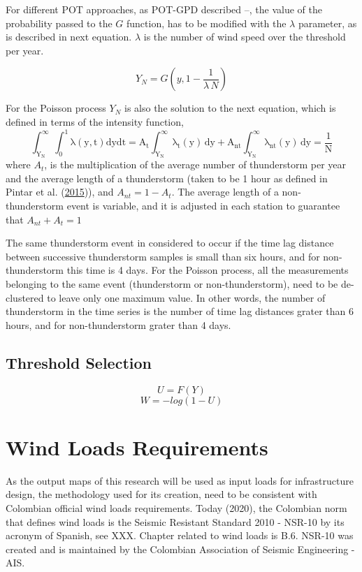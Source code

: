 \documentclass[12pt,oneside]{reedthesis}
\begin{document}
For different POT approaches, as POT-GPD described --, the value of the probability passed to the \(G\) function, has to be modified with the \(\lambda\) parameter, as is described in next equation. \(\lambda\) is the number of wind speed over the threshold per year.

\[
Y_N =G\left(y, 1-\frac{1}{\lambda\,N}\right)
\]

For the Poisson process \(Y_N\) is also the solution to the next equation, which is defined in terms of the intensity function,
\begin{equation}
  \mathrm{
          \int_{Y_N}^{\infty}\int_0^1\lambda\left( y,t\right)dydt = A_t\int_{Y_N}^{\infty}\lambda_t\left( y\right)\,dy + A_{nt}\int_{Y_N}^{\infty}\lambda_{nt}\left( y\right)\,dy = \frac{1}{N}
         }
  \label{eq:ppmri}
\end{equation}
where \(A_t\), is the multiplication of the average number of thunderstorm per year and the average length of a thunderstorm (taken to be 1 hour as defined in Pintar et al. (\protect\hyperlink{ref-Pintar2015}{2015})), and \(A_{nt} = 1 - A_t\). The average length of a non-thunderstorm event is variable, and it is adjusted in each station to guarantee that \(A_{nt} + A_t = 1\)

The same thunderstorm event in considered to occur if the time lag distance between successive thunderstorm samples is small than six hours, and for non-thunderstorm this time is 4 days. For the Poisson process, all the measurements belonging to the same event (thunderstorm or non-thunderstorm), need to be de-clustered to leave only one maximum value. In other words, the number of thunderstorm in the time series is the number of time lag distances grater than 6 hours, and for non-thunderstorm grater than 4 days.

\hypertarget{threshold-selection}{%
\subsection{Threshold Selection}\label{threshold-selection}}

\[U=F(Y)\]
\[W = -log(1-U)\]

\hypertarget{wind-loads-requirements}{%
\section{Wind Loads Requirements}\label{wind-loads-requirements}}

As the output maps of this research will be used as input loads for infrastructure design, the methodology used for its creation, need to be consistent with Colombian official wind loads requirements. Today (2020), the Colombian norm that defines wind loads is the Seismic Resistant Standard 2010 - NSR-10 by its acronym of Spanish, see XXX. Chapter related to wind loads is B.6. NSR-10 was created and is maintained by the Colombian Association of Seismic Engineering - AIS.
\end{document}
